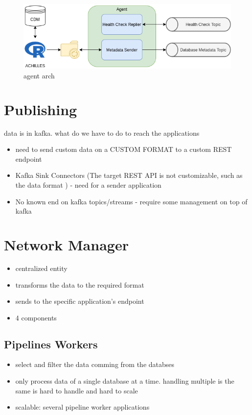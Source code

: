\begin{figure}[h]
    \center
    \includegraphics[width=\textwidth]{agent-architecture}
    \caption{agent arch}
    \label{fig:agent-architecture}
\end{figure}

\section{Publishing}

data is in kafka. what do we have to do to reach the applications

\begin{itemize}
    \item need to send custom data on a CUSTOM FORMAT to a custom REST endpoint
    \item Kafka Sink Connectors (The target REST API is not customizable, such as the data format ) - need for a sender application
    \item No known end on kafka topics/streams - require some management on top of kafka
\end{itemize}

\section{Network Manager}  %
\begin{itemize}
    \item centralized entity
    \item transforms the data to the required format
    \item sends to the specific application's endpoint
    \item 4 components
\end{itemize}

\subsection{Pipelines Workers}
\begin{itemize}
    \item select and filter the data comming from the databses
    \item only process data of a single database at a time. handling multiple is the same is hard to handle and hard to scale
    \item scalable: several pipeline worker applications
\end{itemize}
